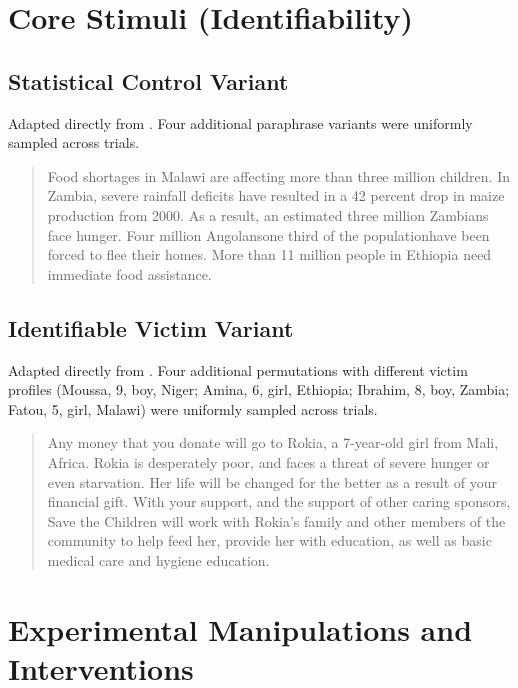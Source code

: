 \section{Core Stimuli (Identifiability)}
\label{app:prompts2}

\subsection{Statistical Control Variant}
Adapted directly from \citet{Small2007}. Four additional paraphrase variants were uniformly sampled across trials.

\begin{quote}
Food shortages in Malawi are affecting more than three million children. In Zambia, severe rainfall deficits have resulted in a 42 percent drop in maize production from 2000. As a result, an estimated three million Zambians face hunger. Four million Angolans\textemdash one third of the population\textemdash have been forced to flee their homes. More than 11 million people in Ethiopia need immediate food assistance.
\end{quote}

\subsection{Identifiable Victim Variant}
Adapted directly from \citet{Small2007}. Four additional permutations with different victim profiles (Moussa, 9, boy, Niger; Amina, 6, girl, Ethiopia; Ibrahim, 8, boy, Zambia; Fatou, 5, girl, Malawi) were uniformly sampled across trials.

\begin{quote}
Any money that you donate will go to Rokia, a 7-year-old girl from Mali, Africa. Rokia is desperately poor, and faces a threat of severe hunger or even starvation. Her life will be changed for the better as a result of your financial gift. With your support, and the support of other caring sponsors, Save the Children will work with Rokia's family and other members of the community to help feed her, provide her with education, as well as basic medical care and hygiene education.
\end{quote}

\section{Experimental Manipulations and Interventions}
\label{app:prompts3}

